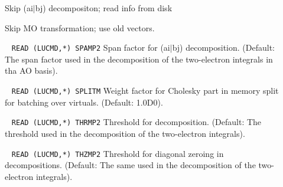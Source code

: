 \begin{description}
%
\item[] 
        Skip (ai$\mid$bj) decompositon; read info from disk
%
\item[] 
        Skip MO transformation; use old vectors.
%
\item[] \verb| |\newline
\verb|READ (LUCMD,*) SPAMP2|\newline
        Span factor for (ai$\mid$bj) decomposition. (Default: 
        The span factor used in the decomposition of
        the two-electron integrals in tha AO basis).
%
\item[] \verb| |\newline
\verb|READ (LUCMD,*) SPLITM|\newline
        Weight factor for Cholesky part in memory split for
        batching over virtuals. (Default: 1.0D0).
%
\item[] \verb| |\newline
\verb|READ (LUCMD,*) THRMP2|\newline
        Threshold for decomposition. (Default: 
        The threshold used in the decomposition of
        the two-electron integrals).
%
\item[] \verb| |\newline
\verb|READ (LUCMD,*) THZMP2|\newline
        Threshold for diagonal zeroing in decompositions. (Default: 
        The same used in the decomposition of
        the two-electron integrals).
%
\end{description}
